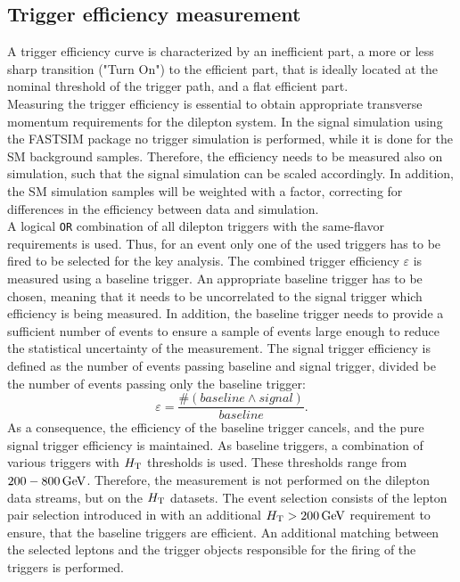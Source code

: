 \subsection*{Trigger efficiency measurement}
A trigger efficiency curve is characterized by an inefficient part, a more or less sharp transition ("Turn On") to the efficient part, that is ideally located at the nominal threshold of the trigger path, and a flat efficient part.\\
Measuring the trigger efficiency is essential to obtain appropriate transverse momentum requirements for the dilepton system. In the signal simulation using the \textsc{FASTSIM} package no trigger simulation is performed, while it is done for the SM background samples. Therefore, the efficiency needs to be measured also on simulation, such that the signal simulation can be scaled accordingly. In addition, the SM simulation samples will be weighted with a factor, correcting for differences in the efficiency between data and simulation.\\
A logical \texttt{OR} combination of all dilepton triggers with the same-flavor requirements is used. Thus, for an event only one of the used triggers has to be fired to be selected for the key analysis. The combined trigger efficiency $\varepsilon$ is measured using a baseline trigger. An appropriate baseline trigger has to be chosen, meaning that it needs to be uncorrelated to the signal trigger which efficiency is being measured. In addition, the baseline trigger needs to provide a sufficient number of events to ensure a sample of events large enough to reduce the statistical uncertainty of the measurement. The signal trigger efficiency is defined as the number of events passing baseline and signal trigger, divided be the number of events passing only the baseline trigger:
\begin{equation}
 \varepsilon=\frac{\#(baseline \wedge signal)}{baseline}.
\end{equation}
As a consequence, the efficiency of the baseline trigger cancels, and the pure signal trigger efficiency is maintained. As baseline triggers, a combination of various triggers with $H_{\mathrm{T}}$ thresholds is used. These thresholds range from $200-800\,\text{Ge\hspace{-.08em}V}$. Therefore, the measurement is not performed on the dilepton data streams, but on the $H_{\mathrm{T}}$ datasets. The event selection consists of the lepton pair selection introduced in  with an additional $H_{\mathrm{T}}>200\,\text{Ge\hspace{-.08em}V}$ requirement to ensure, that the baseline triggers are efficient. An additional matching between the selected leptons and the trigger objects responsible for the firing of the triggers is performed.\\
